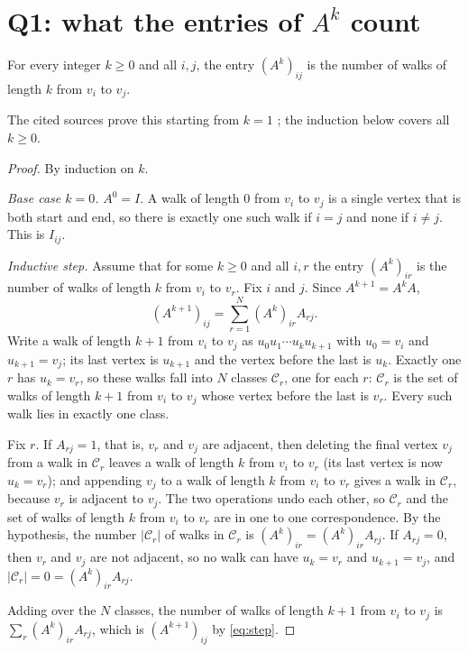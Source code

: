 \section{Q1: what the entries of \texorpdfstring{$A^k$}{powers of A} count}\label{sec:counting}

\begin{theorem}\label{thm:counting}
For every integer $k\ge 0$ and all $i,j$, the entry $(A^k)_{ij}$ is the number of walks of length $k$ from $v_i$ to $v_j$.
\end{theorem}
The cited sources prove this starting from $k=1$ \cite[Theorem~1.1.3, p.~4]{galwaynotes}\cite[Proposition~2, p.~1]{gotti18211}\cite[Theorem~1, p.~1]{bai2025adjacency}; the induction below covers all $k\ge0$.
\begin{proof}
By induction on $k$.

\emph{Base case $k=0$.} $A^0=I$. A walk of length $0$ from $v_i$ to $v_j$ is a single vertex that is both start and end, so there is exactly one such walk if $i=j$ and none if $i\ne j$. This is $I_{ij}$.

\emph{Inductive step.} Assume that for some $k\ge0$ and all $i,r$ the entry $(A^k)_{ir}$ is the number of walks of length $k$ from $v_i$ to $v_r$. Fix $i$ and $j$. Since $A^{k+1}=A^kA$,
\begin{equation}\label{eq:step}
(A^{k+1})_{ij}=\sum_{r=1}^{N}(A^k)_{ir}A_{rj}.
\end{equation}
Write a walk of length $k+1$ from $v_i$ to $v_j$ as $u_0u_1\cdots u_ku_{k+1}$ with $u_0=v_i$ and $u_{k+1}=v_j$; its last vertex is $u_{k+1}$ and the vertex before the last is $u_k$. Exactly one $r$ has $u_k=v_r$, so these walks fall into $N$ classes $\mathcal C_r$, one for each $r$: $\mathcal C_r$ is the set of walks of length $k+1$ from $v_i$ to $v_j$ whose vertex before the last is $v_r$. Every such walk lies in exactly one class.

Fix $r$. If $A_{rj}=1$, that is, $v_r$ and $v_j$ are adjacent, then deleting the final vertex $v_j$ from a walk in $\mathcal C_r$ leaves a walk of length $k$ from $v_i$ to $v_r$ (its last vertex is now $u_k=v_r$); and appending $v_j$ to a walk of length $k$ from $v_i$ to $v_r$ gives a walk in $\mathcal C_r$, because $v_r$ is adjacent to $v_j$. The two operations undo each other, so $\mathcal C_r$ and the set of walks of length $k$ from $v_i$ to $v_r$ are in one to one correspondence. By the hypothesis, the number $|\mathcal C_r|$ of walks in $\mathcal C_r$ is $(A^k)_{ir}=(A^k)_{ir}A_{rj}$. If $A_{rj}=0$, then $v_r$ and $v_j$ are not adjacent, so no walk can have $u_k=v_r$ and $u_{k+1}=v_j$, and $|\mathcal C_r|=0=(A^k)_{ir}A_{rj}$.

Adding over the $N$ classes, the number of walks of length $k+1$ from $v_i$ to $v_j$ is $\sum_r(A^k)_{ir}A_{rj}$, which is $(A^{k+1})_{ij}$ by \cref{eq:step}.
\end{proof}

